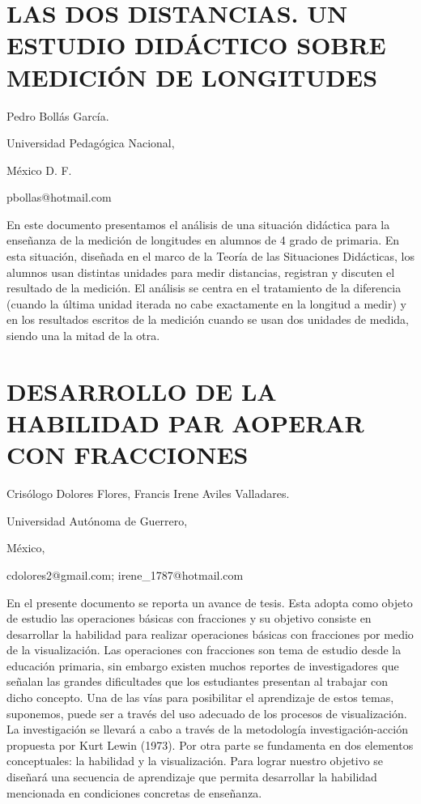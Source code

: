 \section{LAS DOS DISTANCIAS. UN ESTUDIO DIDÁCTICO SOBRE MEDICIÓN DE LONGITUDES}

\begin{datos}

Pedro Bollás García.

Universidad Pedagógica Nacional,

México D. F. 

pbollas@hotmail.com 

\end{datos}

En este documento presentamos el análisis de una situación didáctica
para la enseñanza de la medición de longitudes en alumnos de 4\textdegree{}
grado de primaria. En esta situación, diseñada en el marco de la Teoría
de las Situaciones Didácticas, los alumnos usan distintas unidades
para medir distancias, registran y discuten el resultado de la medición.
El análisis se centra en el tratamiento de la diferencia (cuando la
última unidad iterada no cabe exactamente en la longitud a medir)
y en los resultados escritos de la medición cuando se usan dos unidades
de medida, siendo una la mitad de la otra. 


\section{DESARROLLO DE LA HABILIDAD PAR AOPERAR CON FRACCIONES}

\begin{datos}

Crisólogo Dolores Flores, Francis Irene Aviles Valladares.

Universidad Autónoma de Guerrero,

México,

cdolores2@gmail.com; irene\_1787@hotmail.com

\end{datos}

En el presente documento se reporta un avance de tesis. Esta adopta
como objeto de estudio las operaciones básicas con fracciones y su
objetivo consiste en desarrollar la habilidad para realizar operaciones
básicas con fracciones por medio de la visualización. Las operaciones
con fracciones son tema de estudio desde la educación primaria, sin
embargo existen muchos reportes de investigadores que señalan las
grandes dificultades que los estudiantes presentan al trabajar con
dicho concepto. Una de las vías para posibilitar el aprendizaje de
estos temas, suponemos, puede ser a través del uso adecuado de los
procesos de visualización. La investigación se llevará a cabo a través
de la metodología investigación-acción propuesta por Kurt Lewin (1973).
Por otra parte se fundamenta en dos elementos conceptuales: la habilidad
y la visualización. Para lograr nuestro objetivo se diseñará una secuencia
de aprendizaje que permita desarrollar la habilidad mencionada en
condiciones concretas de enseñanza.


